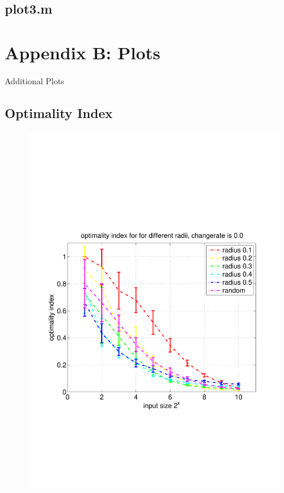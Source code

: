 \documentclass[11pt]{article}
\begin{document}
\subsection*{plot3.m}


\newpage
\section{Appendix B: Plots}

Additional Plots

\subsection{Optimality Index} \label{addplotopt}

\begin{figure}[h!]
	\includegraphics[trim=0 180 0 180, clip,width=\linewidth]{../../code/data/2014_12_12_00_55_41/figure_1}
\end{figure}
\end{document}
